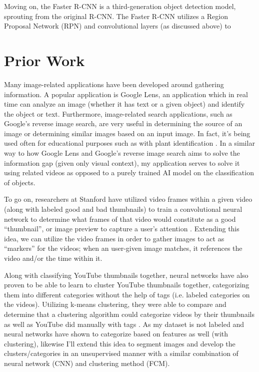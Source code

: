 \documentclass[10pt,twocolumn]{article}
\begin{document}
Moving on, the Faster R-CNN is a third-generation object detection model, sprouting from the original R-CNN. The Faster R-CNN utilizes a Region Proposal Network (RPN) and convolutional layers (as discussed above) to 

\section{Prior Work}

Many image-related applications have been developed around gathering information. A popular application is Google Lens, an application which in real time can analyze an image (whether it has text or a given object) and identify the object or text. Furthermore, image-related search applications, such as Google’s reverse image search, are very useful in determining the source of an image or determining similar images based on an input image. In fact, it’s being used often for educational purposes such as with plant identification \cite{Moore2018}. In a similar way to how Google Lens and Google’s reverse image search aims to solve the information gap (given only visual context), my application serves to solve it using related videos as opposed to a purely trained AI model on the classification of objects.

To go on, researchers at Stanford have utilized video frames within a given video (along with labeled good and bad thumbnails) to train a convolutional neural network to determine what frames of that video would constitute as a good “thumbnail”, or image preview to capture a user’s attention \cite{Stanford2017}. Extending this idea, we can utilize the video frames in order to gather images to act as “markers” for the videos; when an user-given image matches, it references the video and/or the time within it.

Along with classifying YouTube thumbnails together, neural networks have also proven to be able to learn to cluster YouTube thumbnails together, categorizing them into different categories without the help of tags (i.e. labeled categories on the videos). Utilizing k-means clustering, they were able to compare and determine that a clustering algorithm could categorize videos by their thumbnails as well as YouTube did manually with tags \cite{Stanford2021}. As my dataset is not labeled and neural networks have shown to categorize based on features as well (with clustering), likewise I'll extend this idea to segment images and develop the clusters/categories in an unsupervised manner with a similar combination of neural network (CNN) and clustering method (FCM).
\end{document}
